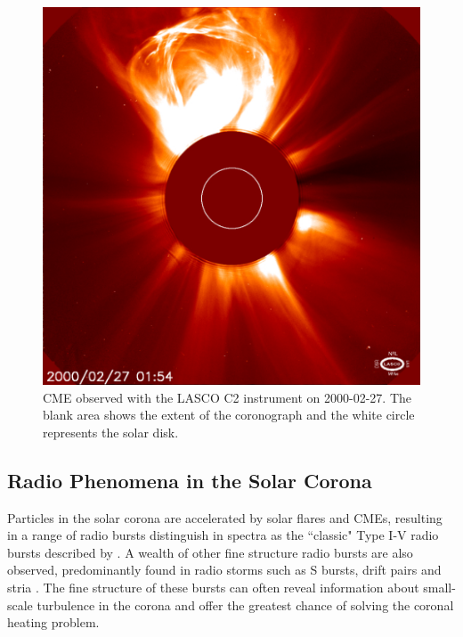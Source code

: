 \begin{figure}
    \centering
    \includegraphics[width=0.5\columnwidth]{Images/LASCO_C2_CME.jpg}
    \caption{CME observed with the LASCO C2 instrument on 2000-02-27. The blank area shows the extent of the coronograph and the white circle represents the solar disk.}
    \label{fig:CME}
\end{figure}








\subsection{Radio Phenomena in the Solar Corona}
Particles in the solar corona are accelerated by solar flares and CMEs, resulting in a range of radio bursts distinguish in spectra as the ``classic" Type I-V radio bursts described by \cite{Wild1950}. A wealth of other fine structure radio bursts are also observed, predominantly found in radio storms such as S bursts, drift pairs and stria \citep{McConnell1980,Melrose1982,NelsonandMelrose1985}. 
 The fine structure of these bursts can often reveal information about small-scale turbulence in the corona \citep{Kontar2017} and offer the greatest chance of solving the coronal heating problem.

